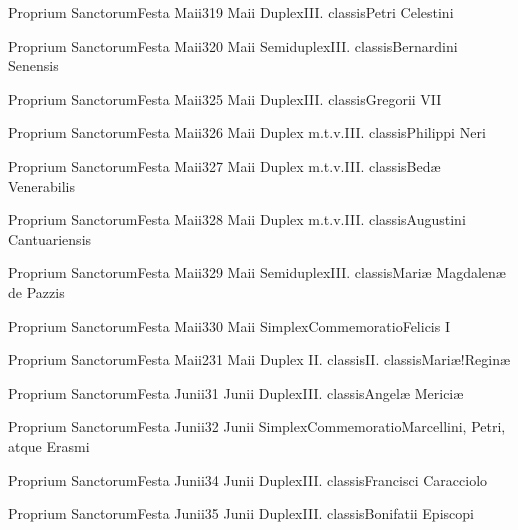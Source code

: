 \documentclass[psalterium-feriale.tex]{subfiles}
\begin{document}
	{Proprium Sanctorum}{Festa Maii}{3}{19 Maii}
	{Duplex}{III. classis}{Petri Celestini}
	{}
	{}
\COPObdRubric

	{Proprium Sanctorum}{Festa Maii}{3}{20 Maii}
	{Semiduplex}{III. classis}{Bernardini Senensis}
	{}
	{}
\COPOadRubric

	{Proprium Sanctorum}{Festa Maii}{3}{25 Maii}
	{Duplex}{III. classis}{Gregorii VII}
	{}
	{}
\COPObdRubric

	{Proprium Sanctorum}{Festa Maii}{3}{26 Maii}
	{Duplex m.t.v.}{III. classis}{Philippi Neri}
	{}
	{}
\COPObdRubric

	{Proprium Sanctorum}{Festa Maii}{3}{27 Maii}
	{Duplex m.t.v.}{III. classis}{Bedæ Venerabilis}
	{}
	{}
\COPOcdRubric

	{Proprium Sanctorum}{Festa Maii}{3}{28 Maii}
	{Duplex m.t.v.}{III. classis}{Augustini Cantuariensis}
	{}
	{}
\COPObdRubric

	{Proprium Sanctorum}{Festa Maii}{3}{29 Maii}
	{Semiduplex}{III. classis}{Mariæ Magdalenæ de Pazzis}
	{}
	{}
\MUVNadRubric

	{Proprium Sanctorum}{Festa Maii}{3}{30 Maii}
	{Simplex}{Commemoratio}{Felicis I}
	{}
	{}
\UMEXadRubric

	{Proprium Sanctorum}{Festa Maii}{2}{31 Maii}
	{Duplex II. classis}{II. classis}{Mariæ!Reginæ}
	{}
	{}
\psalmodiapropria

	{Proprium Sanctorum}{Festa Junii}{3}{1 Junii}
	{Duplex}{III. classis}{Angelæ Mericiæ}
	{}
	{}
\MUVNbdRubric

	{Proprium Sanctorum}{Festa Junii}{3}{2 Junii}
	{Simplex}{Commemoratio}{Marcellini, Petri, atque Erasmi\linebreak\null}
	{}
	{}
\PMEXadRubric

	{Proprium Sanctorum}{Festa Junii}{3}{4 Junii}
	{Duplex}{III. classis}{Francisci Caracciolo}
	{}
	{}
\COPObdRubric

	{Proprium Sanctorum}{Festa Junii}{3}{5 Junii}
	{Duplex}{III. classis}{Bonifatii Episcopi}
	{}
	{}
\UMEXbdRubric
\end{document}
